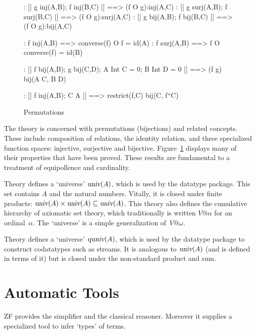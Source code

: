 \begin{figure}
\begin{alltt*}
:        [| g \isasymin inj(A,B);  f \isasymin inj(B,C)  |] ==> (f O g):inj(A,C)
:       [| g \isasymin surj(A,B); f \isasymin surj(B,C) |] ==> (f O g):surj(A,C)
:        [| g \isasymin bij(A,B); f \isasymin bij(B,C) |] ==> (f O g):bij(A,C)

:    f \isasymin inj(A,B) ==> converse(f) O f = id(A)
:   f \isasymin surj(A,B) ==> f O converse(f) = id(B)

:  
    [| f \isasymin bij(A,B);  g \isasymin bij(C,D);  A Int C = 0;  B Int D = 0 |] ==> 
    (f \isasymunion g) \isasymin bij(A \isasymunion C, B \isasymunion D)

: [| f \isasymin inj(A,B);  C \isasymsubseteq A |] ==> restrict(f,C) \isasymin bij(C, f``C)
\end{alltt*}
\caption{Permutations} \label{zf-perm}
\end{figure}

The theory  is concerned with permutations (bijections) and
related concepts.  These include composition of relations, the identity
relation, and three specialized function spaces: injective, surjective and
bijective.  Figure~\ref{zf-perm} displays many of their properties that
have been proved.  These results are fundamental to a treatment of
equipollence and cardinality.

Theory  defines a `universe' $\emph{\sl univ}(A)$, which is used by
the datatype package.  This set contains $A$ and the
natural numbers.  Vitally, it is closed under finite products: 
$\emph{\sl univ}(A)\times\emph{\sl univ}(A)\subseteq\emph{\sl univ}(A)$.  This theory also
defines the cumulative hierarchy of axiomatic set theory, which
traditionally is written $V@\alpha$ for an ordinal~$\alpha$.  The
`universe' is a simple generalization of~$V@\omega$.

Theory  defines a `universe' $\emph{\sl quniv}(A)$, which is used by
the datatype package to construct codatatypes such as streams.  It is
analogous to $\emph{\sl univ}(A)$ (and is defined in terms of it) but is closed
under the non-standard product and sum.


\section{Automatic Tools}

ZF provides the simplifier and the classical reasoner.  Moreover it supplies a
specialized tool to infer `types' of terms.

